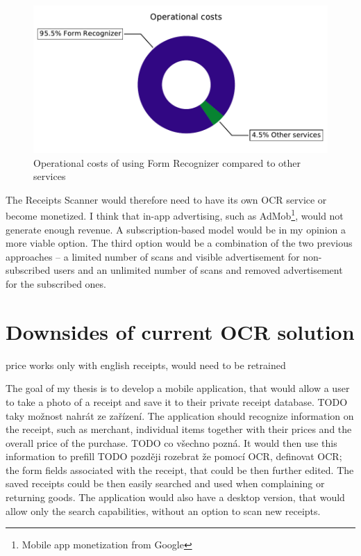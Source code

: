 \documentclass[
  digital, %
  table,   %
  oneside, %
  lof,     %
  lot,     %
]{fithesis3}
\begin{document}
\begin{figure}
    \begin{center}
        \includegraphics[width=1\textwidth]{figures/graphs/operational_costs}
    \end{center}
    \caption{Operational costs of using Form Recognizer compared to other services}
    \label{fig:operational_costs}
\end{figure}

The Receipts Scanner would therefore need to have its own OCR service or become monetized. I think that in-app advertising, such as AdMob\footnote{Mobile app monetization from Google}, would not generate enough revenue. A subscription-based model would be in my opinion a more viable option. The third option would be a combination of the two previous approaches -- a limited number of scans and visible advertisement for non-subscribed users and an unlimited number of scans and removed advertisement for the subscribed ones.


\chapter{Downsides of current OCR solution}
price
works only with english receipts, would need to be retrained

The goal of my thesis is to develop a mobile application, that would allow a user to take a photo of a receipt and save it to their private receipt database. TODO taky možnost nahrát ze zařízení. The application should recognize information on the receipt, such as merchant, individual items together with their prices and the overall price of the purchase. TODO co všechno pozná. It would then use this information to prefill TODO později rozebrat že pomocí OCR, definovat OCR; the form fields associated with the receipt, that could be then further edited. The saved receipts could be then easily searched and used when complaining or returning goods.
The application would also have a desktop version, that would allow only the search capabilities, without an option to scan new receipts.
\end{document}
